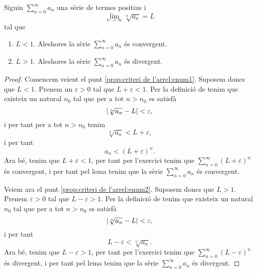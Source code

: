 \documentclass[../Apunts.tex]{subfiles}
\begin{document}
	\begin{proposition}
		\label{prop:criteri de l'arrel}
		Siguin \(\sum_{n=0}^{\infty}a_{n}\) una sèrie de termes positius i
		\[\lim_{n\to\infty}\sqrt[n]{a_{n}}=L\]
		tal que
		\begin{enumerate}
			\item\label{prop:criteri de l'arrel:enum1} \(L<1\). Aleshores la sèrie \(\sum_{n=0}^{\infty}a_{n}\) és convergent.
			\item\label{prop:criteri de l'arrel:enum2} \(L>1\). Aleshores la sèrie \(\sum_{n=0}^{\infty}a_{n}\) és divergent.
		\end{enumerate}
		\begin{proof}
			Comencem veient el punt \eqref{prop:criteri de l'arrel:enum1}.  Suposem doncs que \(L<1\). Prenem un \(\varepsilon>0\) tal que \(L+\varepsilon<1\). Per la definició de  tenim que existeix un natural \(n_{0}\) tal que per a tot \(n>n_{0}\) es satisfà
			\[\abs{\sqrt[n]{a_{n}}-L}<\varepsilon,\]
			i per tant per a tot \(n>n_{0}\) tenim
			\[\sqrt[n]{a_{n}}<L+\varepsilon,\]
			i per tant
			\[a_{n}<\left(L+\varepsilon\right)^{n}.\]
			Ara bé, tenim que \(L+\varepsilon<1\), per tant per l'exercici  tenim que \(\sum_{n=0}^{\infty}(L+\varepsilon)^{n}\) és convergent, i per tant pel lema  tenim que la sèrie \(\sum_{n=0}^{\infty}a_{n}\) és convergent.
			
			Veiem ara el punt \eqref{prop:criteri de l'arrel:enum2}. Suposem doncs que \(L>1\). Prenem \(\varepsilon>0\) tal que \(L-\varepsilon>1\). Per la definició de  tenim que existeix un natural \(n_{0}\) tal que per a tot \(n>n_{0}\) es satisfà
			\[\abs{\sqrt[n]{a_{n}}-L}<\varepsilon,\]
			i per tant
			\[L-\varepsilon<\sqrt[n]{a_{n}}.\]
			Ara bé, tenim que \(L-\varepsilon>1\), per tant per l'exercici  tenim que \(\sum_{n=0}^{\infty}(L-\varepsilon)^{n}\) és divergent, i per tant pel lema  tenim que la sèrie \(\sum_{n=0}^{\infty}a_{n}\) és divergent.
		\end{proof}
	\end{proposition}
\end{document}

